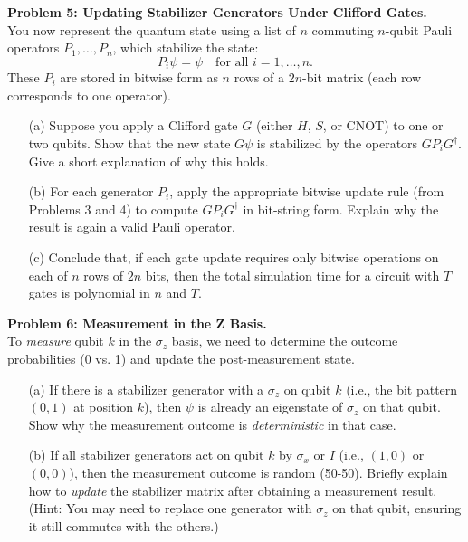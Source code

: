 \documentclass{article}
\begin{document}
\begin{question}
    \textbf{Problem 5: Updating Stabilizer Generators Under Clifford Gates.}\\
    You now represent the quantum state using a list of \(n\) commuting \(n\)-qubit Pauli operators \(P_1, \ldots, P_n\), which stabilize the state:
    \[
    P_i \psi = \psi \quad \text{for all } i = 1, \ldots, n.
    \]
    These \(P_i\) are stored in bitwise form as \(n\) rows of a \(2n\)-bit matrix (each row corresponds to one operator).
    \begin{enumerate}
        \item[(a)] Suppose you apply a Clifford gate \(G\) (either \(H\), \(S\), or CNOT) to one or two qubits. Show that the new state \(G \psi\) is stabilized by the operators \(G P_i G^\dagger\). Give a short explanation of why this holds.
        
        \item[(b)] For each generator \(P_i\), apply the appropriate bitwise update rule (from Problems 3 and 4) to compute \(G P_i G^\dagger\) in bit-string form. Explain why the result is again a valid Pauli operator.
        
        \item[(c)] Conclude that, if each gate update requires only bitwise operations on each of \(n\) rows of \(2n\) bits, then the total simulation time for a circuit with \(T\) gates is polynomial in \(n\) and \(T\).
    \end{enumerate}
\end{question}

\begin{question}
    \textbf{Problem 6: Measurement in the Z Basis.}\\
    To \textit{measure} qubit \(k\) in the \(\sigma_z\) basis, we need to determine the outcome probabilities (0 vs. 1) and update the post-measurement state.
    \begin{enumerate}
        \item[(a)] If there is a stabilizer generator with a \(\sigma_z\) on qubit \(k\) (i.e., the bit pattern \((0, 1)\) at position \(k\)), then \(\psi\) is already an eigenstate of \(\sigma_z\) on that qubit. Show why the measurement outcome is \textit{deterministic} in that case.
        
        \item[(b)] If all stabilizer generators act on qubit \(k\) by \(\sigma_x\) or \(I\) (i.e., \((1, 0)\) or \((0, 0)\)), then the measurement outcome is random (50-50). Briefly explain how to \textit{update} the stabilizer matrix after obtaining a measurement result. (Hint: You may need to replace one generator with \(\sigma_z\) on that qubit, ensuring it still commutes with the others.)
    \end{enumerate}
\end{question}
\end{document}
